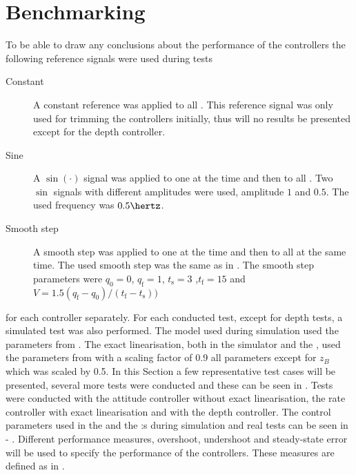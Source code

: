 \section{Benchmarking}
To be able to draw any conclusions about the performance of the controllers the following reference signals were used during tests
\begin{description}
\item[Constant] A constant reference was applied to all \abbrDOF. This reference signal was only used for trimming the controllers initially, thus will no results be presented except for the depth controller.

\item[Sine] A $\sin(\cdot)$ signal was applied to one \abbrDOF at the time and then to all \abbrDOF. Two $\sin$ signals with different amplitudes were used, amplitude $1$ and $0.5$. The used frequency was $0.5 \hertz$.

\item[Smooth step] A smooth step was applied to one \abbrDOF at the time and then to all \abbrDOF at the same time. The used smooth step was the same as in \citet[p. 192]{robotics}. The smooth step parameters were $q_{\text{0}} = 0$, $q_{\text{f}} = 1$, $t_{\text{s}} = 3$ ,$t_{\text{f}} = 15$ and $V = 1.5 (q_{\text{f}} - q_{\text{0}})/(t_{\text{f}} - t_{\text{s}}))$
\end{description}
for each controller separately. For each conducted test, except for depth tests, a simulated test was also performed. The \abbrROV model used during simulation used the parameters from . The exact linearisation, both in the simulator and the \abbrROV, used the parameters from  with a scaling factor of 0.9 all parameters except for $z_B$ which was scaled by 0.5. In this Section a few representative test cases will be presented, several more tests were conducted and these can be seen in . 
Tests were conducted with the \abbrPID attitude controller without exact linearisation, the \abbrPI rate controller with exact linearisation and with the \abbrPI depth controller. The control parameters used in the \abbrPID and the \abbrPI:s during simulation and real tests can be seen in  - . Different performance measures, overshoot, undershoot and steady-state error will be used to specify the performance of the controllers. These measures are defined as in \citet{reglerteori}. 


